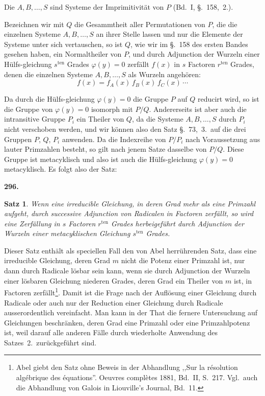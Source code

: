 \documentclass[12pt,a4paper]{article}
\newtheorem*{satz}{Satz}
\begin{document}
Die $A,B,\ldots,S$ sind Systeme der Imprimitivit\"at von $P$ (Bd.~I, \S.~158,~2.).

Bezeichnen wir mit $Q$ die Gesammtheit aller Permutationen von $P$, die die einzelnen Systeme $A,B,\ldots,S$ an ihrer Stelle lassen und nur die Elemente der Systeme unter sich vertauschen, so ist $Q$, wie wir im \S.~158 des ersten Bandes gesehen haben, ein Normaltheiler von $P$, und durch Adjunction der Wurzeln einer H\"ulfs-gleichung $s^{\text{ten}}$ Grades $\varphi(y)=0$ zerf\"allt $f(x)$ in $s$ Factoren $r^{\text{ten}}$ Grades, denen die einzelnen Systeme $A,B,\ldots,S$ als Wurzeln angeh\"oren:
\[
f(x) = f_A(x)\,f_B(x)\,f_C(x)\,\cdots
\]

Da durch die H\"ulfs-gleichung $\varphi(y)=0$ die Gruppe $P$ auf $Q$ reducirt wird, so ist die Gruppe von $\varphi(y)=0$ isomorph mit $P/Q$. Andererseits ist aber auch die intransitive Gruppe $P_i$ ein Theiler von $Q$, da die Systeme $A,B,\ldots,S$ durch $P_i$ nicht verschoben werden, und wir k\"onnen also den Satz \S.~73,~3.\ auf die drei Gruppen $P$, $Q$, $P_i$ anwenden. Da die Indexreihe von $P/P_i$ nach Voraussetzung aus lauter Primzahlen besteht, so gilt nach jenem Satze dasselbe von $P/Q$. Diese Gruppe ist metacyklisch und also ist auch die H\"ulfs-gleichung $\varphi(y)=0$ metacyklisch. Es folgt also der Satz:

\bigskip
\noindent\textbf{296.}
\begin{satz}
Wenn eine irreducible Gleichung, in deren Grad mehr als eine Primzahl aufgeht, durch successive Adjunction von Radicalen in Factoren zerf\"allt, so wird eine Zerf\"allung in $s$ Factoren $r^{\text{ten}}$ Grades herbeigef\"uhrt durch Adjunction der Wurzeln einer metacyklischen Gleichung $s^{\text{ten}}$ Grades.
\end{satz}

Dieser Satz enth\"alt als speciellen Fall den von Abel herr\"uhrenden Satz, dass eine irreducible Gleichung, deren Grad $m$ nicht die Potenz einer Primzahl ist, nur dann durch Radicale l\"osbar sein kann, wenn sie durch Adjunction der Wurzeln einer l\"osbaren Gleichung niederen Grades, deren Grad ein Theiler von $m$ ist, in Factoren zerf\"allt\footnote{Abel giebt den Satz ohne Beweis in der Abhandlung ,,Sur la r\'esolution alg\'ebrique des \'equations''. Oeuvres compl\`etes 1881, Bd.~II, S.~217. Vgl.\ auch die Abhandlung von Galois in Liouville's Journal, Bd.~11.}. Damit ist die Frage nach der Aufl\"osung einer Gleichung durch Radicale oder auch nur der Reduction einer Gleichung durch Radicale ausserordentlich vereinfacht. Man kann in der That die fernere Untersuchung auf Gleichungen beschr\"anken, deren Grad eine Primzahl oder eine Primzahlpotenz ist, weil darauf alle anderen F\"alle durch wiederholte Anwendung des Satzes~2.\ zur\"uckgef\"uhrt sind.
\end{document}

